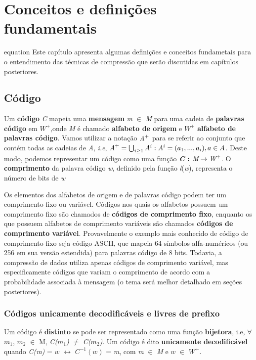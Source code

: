 \chapter{Conceitos e definições fundamentais}equation
Este capítulo apresenta algumas definições e conceitos fundametais para o entendimento das técnicas de compressão que serão discutidas em capítulos posteriores.

\section{Código}

Um \textbf{código} \emph{C} mapeia uma \textbf{mensagem} \emph{m} $\in$ \emph{M} para uma cadeia de \textbf{palavras código} em \emph{$W^+$},onde \emph{M} é chamado \textbf{alfabeto de origem} e \emph{$W^+$} \textbf{alfabeto de palavras código}. Vamos utilizar a notação $\emph{A}^+$ para se referir ao conjunto que contém todas as cadeias de \emph{A}, \emph{i.e}, $\emph{A}^+ = \bigcup_{i \geq 1}^{}A^{i} : A^i = (a_1,...,a_i), a \in A $. Deste modo, podemos representar um código como uma função \textbf{\emph{C} : $\emph{M} \rightarrow \emph{W}^+$}.  O \textbf{comprimento} da palavra código \emph{w}, definido pela função \emph{l}(\emph{w}), representa o número de bits de \emph{w}

Os elementos dos alfabetos de origem e de palavras código podem ter um comprimento fixo ou variável. Códigos nos quais os alfabetos possuem um comprimento fixo são chamados de \textbf{códigos de comprimento fixo}, enquanto os que possuem alfabetos de comprimento variáveis são chamados \textbf{códigos de comprimento variável}. Provavelmente o exemplo mais conhecido de código de comprimento fixo seja código ASCII, que mapeia 64 símbolos alfa-numéricos (ou 256 em sua versão estendida) para palavras código de 8 bits. Todavia, a compressão de dados utiliza apenas códigos de comprimento variável, mas especificamente códigos que variam o comprimento de acordo com a probabilidade associada à mensagem (o tema será melhor detalhado em seções posteriores). 

\subsection{Códigos unicamente decodificáveis e livres de prefixo}
Um código é \textbf{distinto} se pode ser representado como uma função \textbf{bijetora}, i.e, $\forall$ $m_1$, $m_2$ $\in$ M, \emph{C($m_1$)} $\neq$ \emph{C($m_2$)}. Um código é dito \textbf{unicamente decodificável} quando \emph{C(m)} = $w$ $\leftrightarrow$ \emph{$C^{-1}(w)$} = \emph{m}, com \emph{m} $\in$ \emph{M} e \emph{$w$} $\in$ $W^+$.

